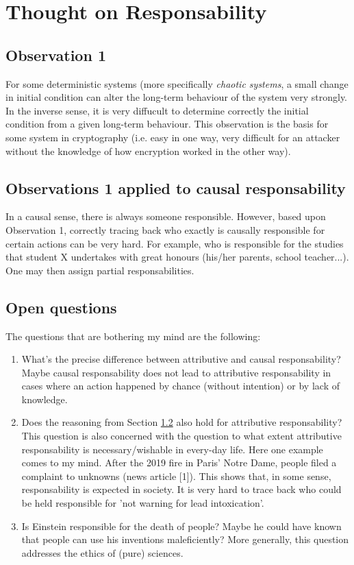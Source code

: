 \documentclass[../main/main.tex]{subfiles}
\begin{document}
\section{Thought on Responsability}

\subsection{Observation 1}
For some deterministic systems (more specifically \textit{chaotic systems}, a small change in initial condition can alter the long-term behaviour of the system very strongly. In the inverse sense, it is very diffucult to determine correctly the initial condition from a given long-term behaviour. This observation is the basis for some system in cryptography (i.e. easy in one way, very difficult for an attacker without the knowledge of how encryption worked in the other way).

\subsection{Observations 1 applied to causal responsability}
\label{observation_causal_respo}
In a causal sense, there is always someone responsible. However, based upon Observation 1, correctly tracing back who exactly is causally responsible for certain actions can be very hard. For example, who is responsible for the studies that student X undertakes with great honours (his/her parents, school teacher...). One may then assign partial responsabilities. 


\subsection{Open questions}
The questions that are bothering my mind are the following:
\begin{enumerate}
\item What's the precise difference between attributive and causal responsability? Maybe causal responsability does not lead to attributive responsability in cases where an action happened by chance (without intention) or by lack of knowledge. 

\item Does the reasoning from Section \ref{observation_causal_respo} also hold for attributive responsability? This question is also concerned with the question to what extent attributive responsability is necessary/wishable in every-day life. Here one example comes to my mind. After the 2019 fire in Paris' Notre Dame, people filed a complaint to unknowns (news article [1]). This shows that, in some sense, responsability is expected in society. It is very hard to trace back who could be held responsible for 'not warning for lead intoxication'.

\item Is Einstein responsible for the death of people? Maybe he could have known that people can use his inventions maleficiently? More generally, this question addresses the ethics of (pure) sciences.
\end{enumerate}
\end{document}
